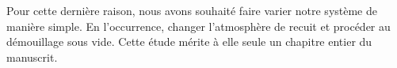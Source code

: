 Pour cette dernière raison, nous avons souhaité faire varier notre système de manière simple. En l'occurrence, changer l'atmosphère de recuit et procéder au démouillage sous vide. Cette étude mérite à elle seule un chapitre entier du manuscrit.


\newpage


